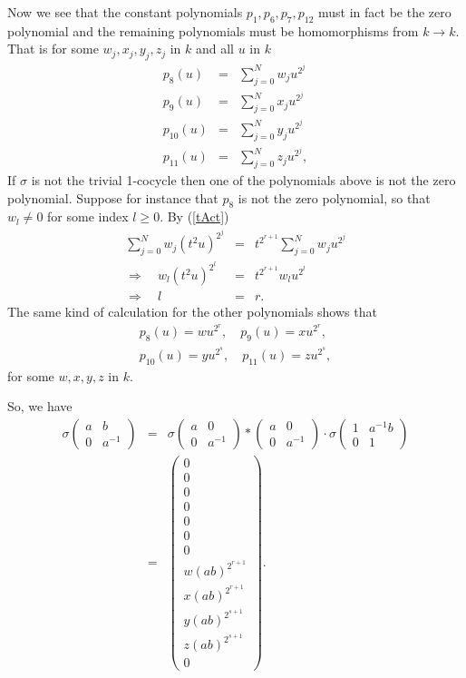 Now we see that the constant polynomials $p_1,p_6,p_7,p_{12}$ must in fact be the zero polynomial and the remaining polynomials must be homomorphisms from $k\rightarrow k$. That is for some $w_j, x_j, y_j, z_j$ in $k$ and all $u$ in $k$
\begin{eqnarray*}
p_8(u) &=& \sum_{j=0}^N w_j u^{2^j} \\
p_9(u) &=& \sum_{j=0}^N x_j u^{2^j} \\
p_{10}(u) &=& \sum_{j=0}^N y_j u^{2^j} \\
p_{11}(u) &=& \sum_{j=0}^N z_j u^{2^j}, 
\end{eqnarray*}
If $\sigma$ is not the trivial 1-cocycle then one of the polynomials above is not the zero polynomial. Suppose for instance that $p_8$ is not the zero polynomial, so that $w_l\neq 0$ for some index $l\geq 0$. By (\ref{tAct})
\begin{eqnarray*}
\sum_{j=0}^N w_j (t^2u)^{2^j} &=& t^{2^{r+1}}\sum_{j=0}^N w_j u^{2^j} \\
\Rightarrow\quad w_l (t^2u)^{2^l} &=& t^{2^{r+1}} w_l u^{2^l} \\
\Rightarrow\quad l &=& r.
\end{eqnarray*}
The same kind of calculation for the other polynomials shows that
\begin{eqnarray*}
p_8(u) = wu^{2^{r}}, \quad p_9(u) = xu^{2^{r}}, \\
p_{10}(u) = yu^{2^{s}}, \quad p_{11}(u) = zu^{2^{s}},
\end{eqnarray*}
for some $w,x,y,z$ in $k$.

So, we have
\begin{eqnarray*}
\sigma\left(\begin{matrix} a & b \\ 0 & a^{-1} \end{matrix}\right) &=&
\sigma\left(\begin{matrix} a & 0 \\ 0 & a^{-1} \end{matrix}\right) * 
\left(\begin{matrix} a & 0 \\ 0 & a^{-1} \end{matrix}\right)\cdot
\sigma\left(\begin{matrix} 1 & a^{-1}b \\ 0 & 1 \end{matrix}\right) \\
&=&
\left( \begin{matrix}
0 \\
0 \\
0 \\
0 \\
0 \\
0 \\
0 \\
w(ab)^{2^{r+1}} \\
x(ab)^{2^{r+1}} \\
y(ab)^{2^{s+1}} \\
z(ab)^{2^{s+1}} \\
0
\end{matrix} \right).
\end{eqnarray*}

